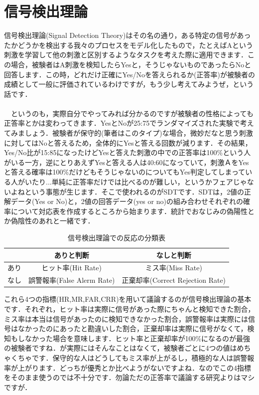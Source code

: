 \documentclass[11pt,a4paper,dvipdfmx]{ujreport}
\begin{document}
\section{信号検出理論}
信号検出理論(Signal Detection Theory)はその名の通り，ある特定の信号があったかどうかを検出する我々のプロセスをモデル化したもので，たとえばAという刺激を学習して他の刺激と区別するようなタスクを考えた際に適用できます．この場合，被験者はA刺激を検知したらYesと，そうじゃないものであったらNoと回答します．この時，どれだけ正確にYes/Noを答えられるか(正答率)が被験者の成績として一般に評価されているわけですが，もう少し考えてみようぜ，という話です．\\
\\
　というのも，実際自分でやってみれば分かるのですが被験者の性格によっても正答率とかは変わってきます．YesとNoが25:75でランダマイズされた実験で考えてみましょう．被験者が保守的(筆者はこのタイプ)な場合，微妙だなと思う刺激に対してはNoと答えるため，全体的にYesと答える回数が減ります．その結果，Yes/No比が15:85になったけどYesと答えた刺激の中での正答率は100\%という人がいる一方，逆にとりあえずYesと答える人は40:60になっていて，刺激ＡをYesと答える確率は100\%だけどもそうじゃないのについてもYes判定してしまっている人がいたり...単純に正答率だけでは比べるのが難しい，というかフェアじゃないよねという事態が生じます．そこで使われるのがSDTです．SDTは，2値の正解データ(Yes or No)と，2値の回答データ(yes or no)の組み合わせそれぞれの確率について対応表を作成するところから始まります．統計でおなじみの偽陽性とか偽陰性のあれと一緒です．

\begin{table}[H]
  \centering
    \caption{信号検出理論での反応の分類表}
    \begin{tabular}{|l||c|c|}  \hline
       & ありと判断 & なしと判断 \\ \hline \hline
      あり & ヒット率(Hit Rate) & ミス率(Miss Rate)  \\ \hline
      なし & 誤警報率(False Alerm Rate) & 正棄却率(Correct Rejection Rate)  \\ \hline
    \end{tabular}
  \end{table}

これら4つの指標(HR,MR,FAR,CRR)を用いて議論するのが信号検出理論の基本です．それぞれ，ヒット率は実際に信号があった際にちゃんと検知できた割合，ミス率は本当は信号があったのに検知できなかった割合，誤警報率は実際には信号はなかったのにあったと勘違いした割合，正棄却率は実際に信号がなくて，検知もしなかった場合を意味します．ヒット率と正棄却率が100\%になるのが最強の被験者ですね．が実際にはそんなことはなくて，被験者ごとに4つの値はめちゃくちゃです．保守的な人はどうしてもミス率が上がるし，積極的な人は誤警報率が上がります．どっちが優秀とか比べようがないですよね．なのでこの4指標をそのまま使うのでは不十分です．勿論ただの正答率で議論する研究よりはマシですが．\\
\\
\end{document}
